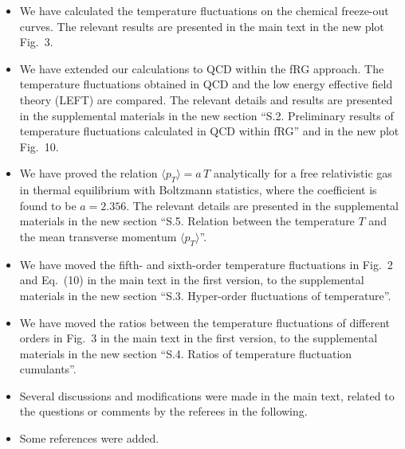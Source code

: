 \documentclass[aps,article,author-year,notitlepage,showpacs]{revtex4-2}
\begin{document}
\begin{itemize}

\item[$\bullet$] We have calculated the temperature fluctuations on the chemical freeze-out curves. The relevant results are presented in the main text in the new plot Fig.~3.

\item[$\bullet$] We have extended our calculations to QCD within the fRG approach. The temperature fluctuations obtained in QCD and the low energy effective field theory (LEFT) are compared. The relevant details and results are presented in the supplemental materials in the new section ``S.2. Preliminary results of temperature fluctuations calculated in QCD within fRG'' and in the new plot Fig.~10.

\item[$\bullet$] We have proved the relation $\langle p_{T} \rangle=a\, T$ analytically for a free relativistic gas in thermal equilibrium with Boltzmann statistics, where the coefficient is found to be $a=2.356$. The relevant details are presented in the supplemental materials in the new section ``S.5. Relation between the temperature $T$ and the mean transverse momentum $\langle p_{T} \rangle$''.

\item[$\bullet$] We have moved the fifth- and sixth-order temperature fluctuations in Fig.~2 and Eq.~(10) in the main text in the first version, to the supplemental materials in the new section ``S.3. Hyper-order fluctuations of temperature''.

\item[$\bullet$] We have moved the ratios between the temperature fluctuations of different orders in Fig.~3 in the main text in the first version, to the supplemental materials in the new section ``S.4. Ratios of temperature fluctuation cumulants''.

\item[$\bullet$] Several discussions and modifications were made in the main text, related to the questions or comments by the referees in the following.

\item[$\bullet$] Some references were added. \\[2ex] 

\end{itemize}

\end{document}
